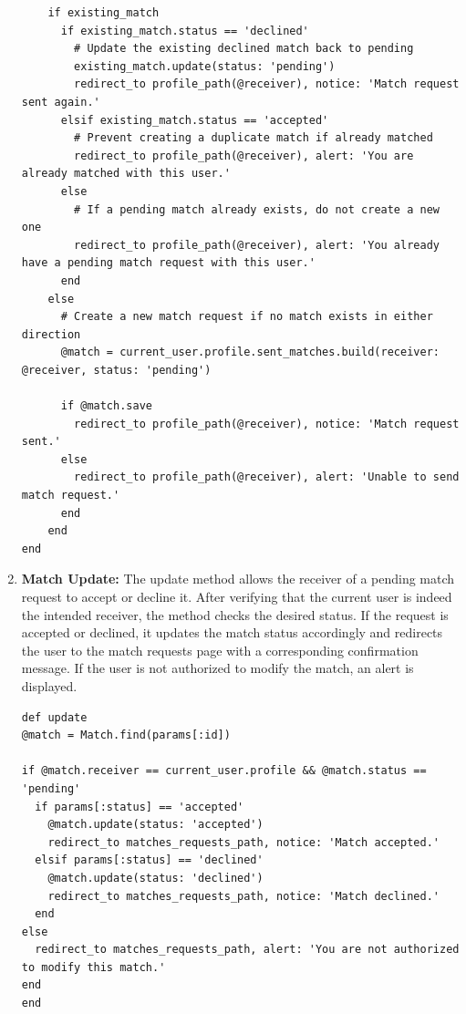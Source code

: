 \begin{enumerate}
\begin{lstlisting}
    if existing_match
      if existing_match.status == 'declined'
        # Update the existing declined match back to pending
        existing_match.update(status: 'pending')
        redirect_to profile_path(@receiver), notice: 'Match request sent again.'
      elsif existing_match.status == 'accepted'
        # Prevent creating a duplicate match if already matched
        redirect_to profile_path(@receiver), alert: 'You are already matched with this user.'
      else
        # If a pending match already exists, do not create a new one
        redirect_to profile_path(@receiver), alert: 'You already have a pending match request with this user.'
      end
    else
      # Create a new match request if no match exists in either direction
      @match = current_user.profile.sent_matches.build(receiver: @receiver, status: 'pending')
      
      if @match.save
        redirect_to profile_path(@receiver), notice: 'Match request sent.'
      else
        redirect_to profile_path(@receiver), alert: 'Unable to send match request.'
      end
    end
end
    \end{lstlisting}
    
    \newpage
    \item \textbf{Match Update:}
    The update method allows the receiver of a pending match request to accept or decline it. After verifying that the current user is indeed the intended receiver, the method checks the desired status. If the request is accepted or declined, it updates the match status accordingly and redirects the user to the match requests page with a corresponding confirmation message. If the user is not authorized to modify the match, an alert is displayed.
    \begin{lstlisting}
def update
@match = Match.find(params[:id])

if @match.receiver == current_user.profile && @match.status == 'pending'
  if params[:status] == 'accepted'
    @match.update(status: 'accepted')
    redirect_to matches_requests_path, notice: 'Match accepted.'
  elsif params[:status] == 'declined'
    @match.update(status: 'declined')
    redirect_to matches_requests_path, notice: 'Match declined.'
  end
else
  redirect_to matches_requests_path, alert: 'You are not authorized to modify this match.'
end
end
    \end{lstlisting}


\end{enumerate}
